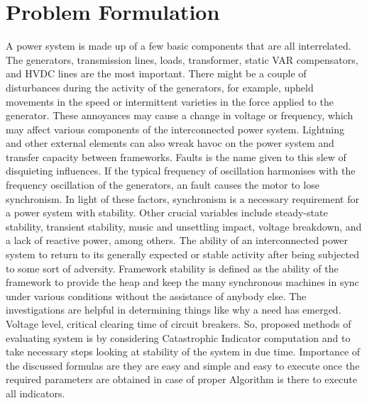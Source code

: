 \section{Problem Formulation}
A power system is made up of a few basic components that are all interrelated. The generators, transmission lines, loads, transformer, static VAR compensators, and HVDC lines are the most important. There might be a couple of disturbances during the activity of the generators, for example, upheld movements in the speed or intermittent varieties in the force applied to the generator. These annoyances may cause a change in voltage or frequency, which may affect various components of the interconnected power system. Lightning and other external elements can also wreak havoc on the power system and transfer capacity between frameworks. Faults is the name given to this slew of disquieting influences. If the typical frequency of oscillation harmonises with the frequency oscillation of the generators, an fault causes the motor to lose synchronism. In light of these factors, synchronism is a necessary requirement for a power system with stability. Other crucial variables include steady-state stability, transient stability, music and unsettling impact, voltage breakdown, and a lack of reactive power, among others. The ability of an interconnected power system to return to its generally expected or stable activity after being subjected to some sort of adversity. Framework stability is defined as the ability of the framework to provide the heap and keep the many synchronous machines in sync under various conditions without the assistance of anybody else. The investigations are helpful in determining things like why a need has emerged. Voltage level, critical clearing time of circuit breakers. So, proposed methods of evaluating system is by considering Catastrophic Indicator computation and to take necessary steps looking at stability of the system in due time. Importance of the discussed formulas are they are easy and simple and easy to execute once the required parameters are obtained in case of proper Algorithm is there to execute all indicators. 